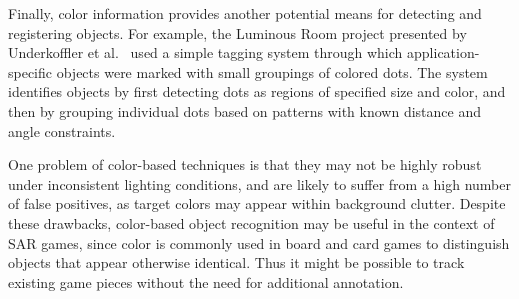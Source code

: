 \documentclass[review]{vgtc}                 %
\begin{document}
%
%
%
Finally, color information provides another potential means for detecting and
registering objects.  For example, the Luminous Room project presented
by Underkoffler et al.~\cite{Underkoffler1999} used a simple tagging
system through which application-specific objects were marked with
small groupings of colored dots.  The system identifies objects by
first detecting dots as regions of specified size and color, and then
by grouping individual dots based on patterns with known distance and
angle constraints.





One problem of color-based techniques is that they may not be highly
robust under inconsistent lighting conditions, and are likely to
suffer from a high number of false positives, as target colors may
appear within background clutter.  
Despite these drawbacks, color-based object recognition may be useful
in the context of SAR games, since color is commonly used in board and
card games to distinguish objects that appear otherwise identical.
Thus it might be possible to track existing game pieces without the
need for additional annotation.
\end{document}
